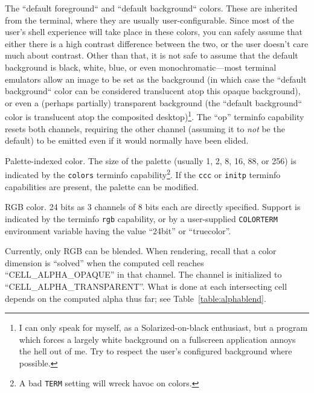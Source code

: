 \begin{denseitemize}
\item{The ``default foreground`` and ``default background`` colors. These are
    inherited from the terminal, where they are usually user-configurable.
    Since most of the user's shell experience will take place in these colors,
    you can safely assume that either there is a high contrast difference
    between the two, or the user doesn't care much about contrast. Other than
    that, it is not safe to assume that the default background is black, white,
    blue, or even monochromatic---most terminal emulators allow an image to be
    set as the background (in which case the ``default background`` color can
    be considered translucent atop this opaque background), or even a (perhaps
    partially) transparent background (the ``default background`` color is
    translucent atop the composited desktop)\footnote{I can only speak for myself, as a Solarized-on-black enthusiast, but a
    program which forces a largely white background on a fullscreen application
    annoys the hell out of me. Try to respect the user's configured background
    where possible.}. The ``op'' terminfo capability resets
    both channels, requiring the other channel (assuming it to \textit{not} be
    the default) to be emitted even if it would normally have been elided.}
\item{Palette-indexed color. The size of the palette (usually 1, 2, 8, 16, 88,
    or 256) is indicated by the \texttt{colors} terminfo capability\footnote{A
    bad \texttt{TERM} setting will wreck havoc on colors.}. If the
    \texttt{ccc} or \texttt{initp} terminfo capabilities are present, the palette
    can be modified.}
\item{RGB color. 24 bits as 3 channels of 8 bits each are directly specified. Support
    is indicated by the terminfo \texttt{rgb} capability, or by a user-supplied
    \texttt{COLORTERM} environment variable having the value ``24bit'' or ``truecolor''.}
\end{denseitemize}

Currently, only RGB can be blended. When rendering, recall that a color dimension
is ``solved'' when the computed cell reaches ``CELL\_ALPHA\_OPAQUE'' in that channel.
The channel is initialized to ``CELL\_ALPHA\_TRANSPARENT''. What is done at each
intersecting cell depends on the computed alpha thus far; see Table~\ref{table:alphablend}.

